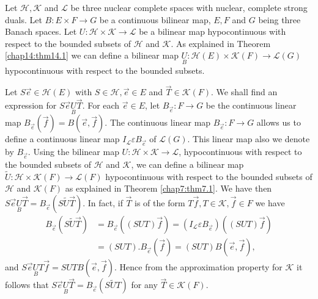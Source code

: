Let $\mathscr{H}, \mathscr{K}$ and $\mathscr{L}$ be three nuclear
complete spaces with nuclear, complete strong duals. Let $B : E \times
F \to G$ be a continuous bilinear map, $E, F$ and $G$ being three
Banach spaces. Let $U : \mathscr{H} \times \mathscr{K} \to
\mathscr{L}$ be a bilinear map hypocontinuous with respect to the
bounded subsets of $\mathscr{H}$ and $\mathscr{K}$. As explained in
Theorem \ref{chap14:thm14.1} we can define a bilinear map
$\underset{B}{U} : \mathscr{H}(E) \times \mathscr{K}(F) \to
\mathscr{L}(G)$ hypocontinuous with respect to the bounded subsets.

Let $S \overrightarrow{e} \in \mathscr{H}(E)$ with $S \in \mathscr{H},
\overrightarrow{e} \in E$ and $\overrightarrow{T} \in
\mathscr{K}(F)$. We shall find an expression for $S \overrightarrow{e}
\underset{B}{U} \overrightarrow{T}$. For each $\overrightarrow{e} \in
E$, let $B_{\overrightarrow{e}} : F \to G$ be the continuous linear
map $B_{\overrightarrow{e}}(\overrightarrow{f}) =
B(\overrightarrow{e}, \overrightarrow{f})$. The continuous linear map
$B_{\overrightarrow{e}} : F \to G$ allows us to define a continuous
linear map $I_{\mathscr{L}} \varepsilon B_{\overrightarrow{e}}$ of
$\mathscr{L}(G)$. This linear map also we denote by
$B_{\overrightarrow{e}}$. Using the bilinear map $U: \mathscr{H}
\times \mathscr{K} \to \mathscr{L}$, hypocontinuous with respect to
the bounded subsets of $\mathscr{H}$ and $\mathscr{K}$, we can define
a bilinear map $\tilde{U} : \mathscr{H} \times \mathscr{K}(F) \to
\mathscr{L}(F)$ hypocontinuous with respect to the bounded subsets of
$\mathscr{H}$ and $\mathscr{K}(F)$ as explained in Theorem
\ref{chap7:thm7.1}. We have then $S \overrightarrow{e} \underset{B}{U}
\overrightarrow{T} = B_{\overrightarrow{e}} (S \tilde{U}
\overrightarrow{T})$. In fact, if $\overrightarrow{T}$ is of the form
$T \overrightarrow{f}, T \in \mathscr{K}, \overrightarrow{f} \in F$ we
have
\begin{align*}
B_{\overrightarrow{e}} (S \tilde{U}\overrightarrow{T}) &=
B_{\overrightarrow{e}} ((S U T) \overrightarrow{f})=(I_{\mathscr{L}}
\varepsilon B_{\overrightarrow{e}}) (( S U T) \overrightarrow{f})\\
&= (S U T). B_{\overrightarrow{e}} (\overrightarrow{f}) = (S U T) B
(\overrightarrow{e}, \overrightarrow{f}),
\end{align*}
and $S \overrightarrow{e} \underset{B}{U} T \overrightarrow{f} = S U T
B(\overrightarrow{e}, \overrightarrow{f})$. Hence from  the
approximation property for $\mathscr{K}$ it follows that $S
\overrightarrow{e} \underset{B}{U} \overrightarrow{T} =
B_{\overrightarrow{e}} (S \tilde{U} T)$ for any $\overrightarrow{T}
\in \mathscr{K}(F)$. 

